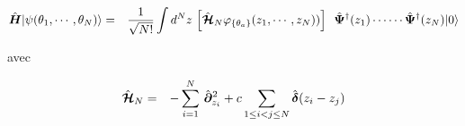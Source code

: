\begin{eqnarray}
	\operator{H}\vert \psi ( \theta_1 , \cdots , \theta_N ) \rangle &= &  \frac{1}{ \sqrt{N!}} \int d^N z \,  	\left [ \operator{\mathcal{H}}_N \varphi_{\{\theta_a\}}(z_1, \cdots ,  z_N)) \right ] \, \operator{\Psi}^\dag(z_1) \cdots  \cdots\operator{\Psi}^\dag(z_N) \vert 0 \rangle		
\end{eqnarray}

avec 

\begin{eqnarray}
	\hat{\bm{\mathcal{H}}}_N & = &  - \sum_{i=1}^N \, \hat{\bm{\partial}}_{z_i}^2 + 	c \sum_{1\leq i<j\leq N} \hat{\bm{\delta}}(z_i - z_j) 		
\end{eqnarray}
